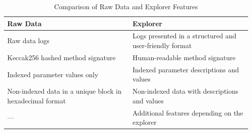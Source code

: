 \documentclass[11pt,a4paper,titlepage]{scrartcl}
\begin{document}
\begin{table}[ht]
\centering
\caption{Comparison of Raw Data and Explorer Features}
\begin{tabular}{p{}p{}}
\hline
\textbf{Raw Data} & \textbf{Explorer} \\ \hline
Raw data logs & Logs presented in a structured and user-friendly format \\ 
Keccak256 hashed method signature & Human-readable method signature \\ 
Indexed parameter values only & Indexed parameter descriptions and values \\ 
Non-indexed data in a unique block in hexadecimal format & Non-indexed data with descriptions and values \\ 
--- & Additional features depending on the explorer \\ \hline
\end{tabular}
\label{tab:raw_vs_explorer}
\end{table}
\end{document}
